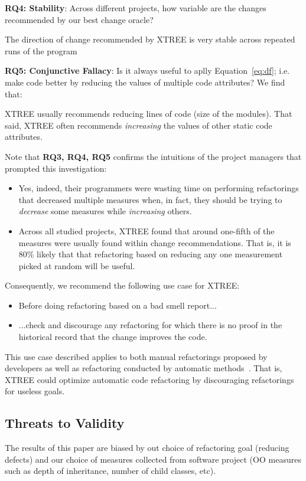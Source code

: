 \documentclass[twocolumn,5p]{elsarticle}
\newcommand{\bi}{\begin{itemize}[leftmargin=0.4cm]}
\newcommand{\ei}{\end{itemize}}
\newcommand{\eq}[1]{Equation~\ref{eq:#1}}
\theoremstyle{break}
\begin{document}
	{\bf RQ4: Stability}: Across different projects, how variable are the changes recommended by our best change oracle?
	\begin{lesson}
		The direction of change recommended by XTREE is  very stable across repeated runs of the program 
	\end{lesson} 
	
	{\bf RQ5: Conjunctive Fallacy}:  
	Is it always  useful  to aplly \eq{df}; i.e. make code better by   reducing the values of  multiple code attributes? We find that:
	\begin{lesson}
		XTREE usually recommends reducing lines of code (size of the modules).
		That said,  XTREE often recommends {\em increasing} the values of other static code attributes.
	\end{lesson} 
	Note that {\bf RQ3, RQ4, RQ5} 
	confirms the intuitions
	of the project managers that prompted this investigation:
	\bi
	\item
	Yes,  indeed, their programmers
	were wasting time on   performing refactorings  that  decreased multiple measures when, in fact,
	they should be trying to {\em decrease} some measures while {\em increasing} others.
	\item
	Across all studied projects, XTREE found that  around one-fifth  
	of the measures were usually found within  change recommendations. That is, it is 80\% likely that
	that refactoring based on reducing any one measurement picked at random will be useful.
	\ei
	Consequently, we  recommend the following use case for  XTREE:
	\bi
	\item Before doing  refactoring based on a bad smell report...
	\item ...check and discourage any refactoring   for which there is no proof
	in the historical record that the change improves the code.
	\ei
	This use case described  applies to both manual refactorings proposed by developers
	as well as refactoring conducted by automatic methods~\cite{mkaouer2015many}. That is, XTREE could optimize automatic
	code refactoring by discouraging refactorings for useless goals.
	
	
	
	\subsection{ Threats to Validity}
	
	The results of this paper are biased by out choice of refactoring goal (reducing defects) and our choice
	of measures collected from software project (OO measures such as
	depth of inheritance, number of child classes, etc).
	
\end{document}
